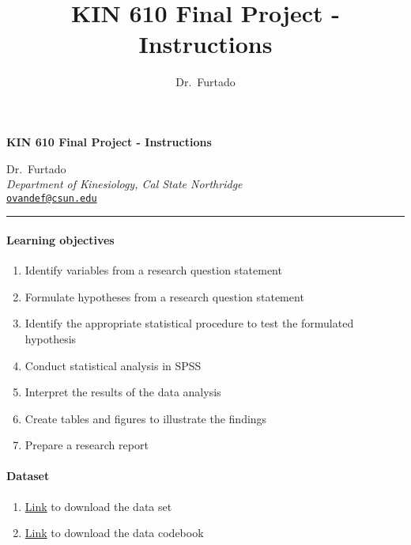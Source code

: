 \documentclass[11pt,]{article}
\title{KIN 610 \textbar{} Final Project - Instructions}
\author{Dr.~Furtado}
\date{}
\newcommand{\blankline}{\quad\pagebreak[2]}
\providecommand{\tightlist}{%
  \setlength{\itemsep}{0pt}\setlength{\parskip}{0pt}}
\begin{document}
  



\thispagestyle{plain} 

\begin{flushleft}\Large \bf KIN 610 \textbar{} Final Project -
Instructions  \end{flushleft}
	\vspace{1 mm}   
Dr.~Furtado \\
\emph{Department of Kinesiology, Cal State Northridge} \\
\texttt{\href{mailto:ovandef@csun.edu}{\nolinkurl{ovandef@csun.edu}}}   \\

  

\hrule

\vspace{6 mm}
	


\hypertarget{learning-objectives}{%
\paragraph{Learning objectives}\label{learning-objectives}}

\begin{enumerate}
\def\labelenumi{\arabic{enumi}.}
\tightlist
\item
  Identify variables from a research question statement
\item
  Formulate hypotheses from a research question statement
\item
  Identify the appropriate statistical procedure to test the formulated
  hypothesis
\item
  Conduct statistical analysis in SPSS
\item
  Interpret the results of the data analysis
\item
  Create tables and figures to illustrate the findings
\item
  Prepare a research report
\end{enumerate}

\hypertarget{dataset}{%
\paragraph{Dataset}\label{dataset}}

\begin{enumerate}
\def\labelenumi{\arabic{enumi}.}
\tightlist
\item
  \href{https://osf.io/bf58v/}{Link} to download the data set
\item
  \href{https://osf.io/sg46v/}{Link} to download the data codebook
\end{enumerate}
\end{document}
